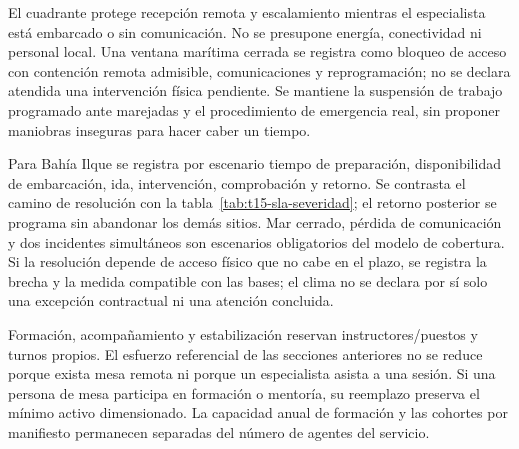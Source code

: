 El cuadrante protege recepción remota y escalamiento mientras el especialista está embarcado o sin comunicación. No se presupone energía, conectividad ni personal local. Una ventana marítima cerrada se registra como bloqueo de acceso con contención remota admisible, comunicaciones y reprogramación; no se declara atendida una intervención física pendiente. Se mantiene la suspensión de trabajo programado ante marejadas y el procedimiento de emergencia real, sin proponer maniobras inseguras para hacer caber un tiempo.

Para Bahía Ilque se registra por escenario tiempo de preparación, disponibilidad de embarcación, ida, intervención, comprobación y retorno. Se contrasta el camino de resolución con la tabla~\ref{tab:t15-sla-severidad}; el retorno posterior se programa sin abandonar los demás sitios. Mar cerrado, pérdida de comunicación y dos incidentes simultáneos son escenarios obligatorios del modelo de cobertura. Si la resolución depende de acceso físico que no cabe en el plazo, se registra la brecha y la medida compatible con las bases; el clima no se declara por sí solo una excepción contractual ni una atención concluida.

Formación, acompañamiento y estabilización reservan instructores/puestos y turnos propios. El esfuerzo referencial de las secciones anteriores no se reduce porque exista mesa remota ni porque un especialista asista a una sesión. Si una persona de mesa participa en formación o mentoría, su reemplazo preserva el mínimo activo dimensionado. La capacidad anual de formación y las cohortes por manifiesto permanecen separadas del número de agentes del servicio.

